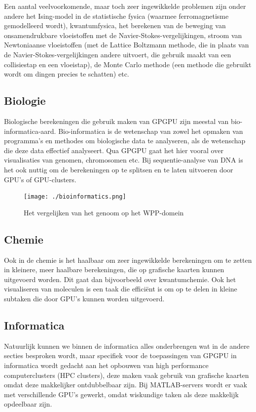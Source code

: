 \documentclass[11pt, a4paper]{article}
\begin{document}
Een aantal veelvoorkomende, maar toch zeer ingewikkelde problemen zijn onder andere het Ising-model\cite{ising} in de statistische fysica (waarmee ferromagnetisme gemodelleerd wordt), kwantumfysica, het berekenen van de beweging van onsamendrukbare vloeistoffen\cite{giancoli} met de Navier-Stokes-vergelijkingen, stroom van Newtoniaanse vloeistoffen (met de Lattice Boltzmann methode, die in plaats van de Navier-Stokes-vergelijkingen andere uitvoert, die gebruik maakt van een collisiestap en een vloeistap), de Monte Carlo methode\cite{montecarlo} (een methode die gebruikt wordt om dingen precies te schatten) etc.

\subsection{Biologie}

Biologische berekeningen die gebruik maken van GPGPU zijn meestal van bio-informatica-aard. Bio-informatica is de wetenschap van zowel het opmaken van programma's en methodes om biologische data te analyseren, als de wetenschap die deze data effectief analyseert. Qua GPGPU gaat het hier vooral over visualisaties van genomen, chromosomen etc. Bij sequentie-analyse van DNA is het ook nuttig om de berekeningen op te splitsen en te laten uitvoeren door GPU's of GPU-clusters.

\begin{figure}[H]
	\centering
	\texttt{[image: ./bioinformatics.png]}
	\caption{Het vergelijken van het genoom op het WPP-domein}	
\end{figure}

\subsection{Chemie}

Ook in de chemie is het haalbaar om zeer ingewikkelde berekeningen om te zetten in kleinere, meer haalbare berekeningen, die op grafische kaarten kunnen uitgevoerd worden. Dit gaat dan bijvoorbeeld over kwantumchemie. Ook het visualiseren van moleculen is een taak die effici\"ent is om op te delen in kleine subtaken die door GPU's kunnen worden uitgevoerd.

\subsection{Informatica}

Natuurlijk kunnen we binnen de informatica alles onderbrengen wat in de andere secties besproken wordt, maar specifiek voor de toepassingen van GPGPU in informatica wordt gedacht aan het opbouwen van high performance computerclusters (HPC clusters\cite{HPCClusters}), deze maken vaak gebruik van grafische kaarten omdat deze makkelijker ontdubbelbaar zijn. Bij MATLAB-servers wordt er vaak met verschillende GPU's gewerkt, omdat wiskundige taken als deze makkelijk opdeelbaar zijn.
\end{document}
